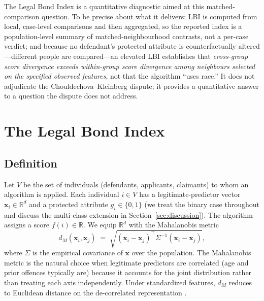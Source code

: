 \documentclass[11pt]{article}
\begin{document}
The Legal Bond Index is a quantitative diagnostic aimed at this
matched-comparison question. To be precise about what it delivers: LBI
is computed from local, case-level comparisons and then aggregated, so
the reported index is a population-level summary of matched-neighbourhood
contrasts, not a per-case verdict; and because no defendant's protected
attribute is counterfactually altered---different people are
compared---an elevated LBI establishes that \emph{cross-group score
divergence exceeds within-group score divergence among neighbours
selected on the specified observed features}, not that the algorithm
``uses race.'' It does not adjudicate the Chouldechova--Kleinberg
dispute; it provides a quantitative answer to a question the dispute
does not address.


\section{The Legal Bond Index}
\label{sec:lbi}

\subsection{Definition}

Let $V$ be the set of individuals (defendants, applicants, claimants)
to whom an algorithm is applied. Each individual $i \in V$ has a
legitimate-predictor vector $\mathbf{x}_i \in \mathbb{R}^d$ and a
protected attribute $g_i \in \{0, 1\}$ (we treat the binary case
throughout and discuss the multi-class extension in
Section~\ref{sec:discussion}). The algorithm assigns a score
$f(i) \in \mathbb{R}$. We equip $\mathbb{R}^d$ with the Mahalanobis
metric
\begin{equation}
\label{eq:mahalanobis}
d_M(\mathbf{x}_i, \mathbf{x}_j) \;=\;
\sqrt{(\mathbf{x}_i - \mathbf{x}_j)^\top \Sigma^{-1} (\mathbf{x}_i - \mathbf{x}_j)},
\end{equation}
where $\Sigma$ is the empirical covariance of $\mathbf{x}$ over the
population. The Mahalanobis metric is the natural choice when
legitimate predictors are correlated (age and prior offences typically
are) because it accounts for the joint distribution rather than
treating each axis independently. Under standardized features,
$d_M$ reduces to Euclidean distance on the de-correlated representation
\citep{mahalanobis1936}.
\end{document}
